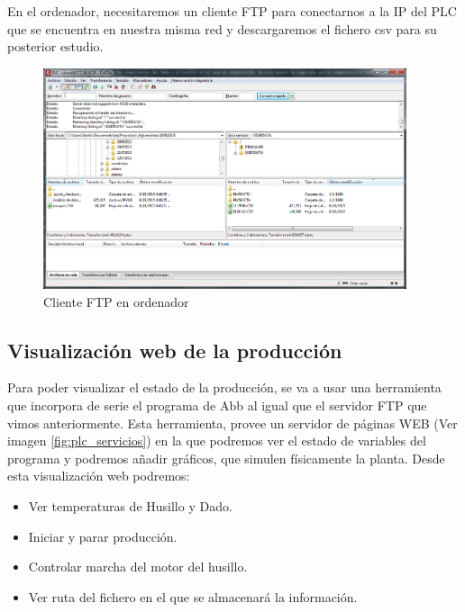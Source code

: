 En el ordenador, necesitaremos un cliente FTP para conectarnos a la IP del PLC que se encuentra en nuestra misma red y descargaremos el fichero csv para su posterior estudio.

    \begin{figure}[H]
            \centering
            \includegraphics[width=0.95\textwidth]{images/PLC/cliente_ftp.png}
            \caption{Cliente FTP en ordenador}
            \label{fig:plc_cliente_ftp}
    \end{figure}

\subsection{Visualización web de la producción}
\label{sec:plc_scada}

Para poder visualizar el estado de la producción, se va a usar una herramienta que incorpora de serie el programa de Abb al igual que el servidor FTP que vimos anteriormente. Esta herramienta, provee un servidor de páginas WEB (Ver imagen \ref{fig:plc_servicios}) en la que podremos ver el estado de variables del programa y podremos añadir gráficos, que simulen físicamente la planta. Desde esta visualización web podremos:

\begin{itemize}
    \item {Ver temperaturas de Husillo y Dado.}
    \item {Iniciar y parar producción.}
    \item {Controlar marcha del motor del husillo.}
    \item {Ver ruta del fichero en el que se almacenará la información.}
\end{itemize}


